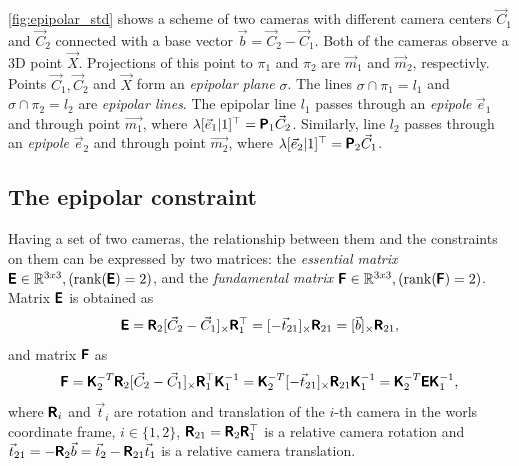 \autoref{fig:epipolar_std} shows a scheme of two cameras with different camera centers $\vec{C}_1$ and $\vec{C}_2$ connected with a base vector $\vec{b} = \vec{C}_2 - \vec{C}_1$. 
Both of the cameras observe a 3D point $\vec{X}$. 
Projections of this point to $\pi_1$ and $\pi_2$ are $\vec{m}_1$ and $\vec{m}_2$, respectivly. 
Points $\vec{C}_1, \vec{C}_2$ and $\vec{X}$ form an \textit{epipolar plane} $\sigma$.
The lines $\sigma \cap \pi_1 = l_1$ and $\sigma \cap \pi_2 = l_2$ are \textit{epipolar lines}. 
The epipolar line $l_1$ passes through an \textit{epipole} $\vec{e}_1$ and through point $\vec{m_1}$, where $\lambda [\vec{e}_1 | 1]^\top = \pmb{\mathsf{P}}_1 \vec{C}_2$.
Similarly, line $l_2$ passes through an \textit{epipole} $\vec{e}_2$ and through point $\vec{m_2}$, where $\lambda [\vec{e}_2 | 1]^\top = \pmb{\mathsf{P}}_2 \vec{C}_1$.

\subsection{The epipolar constraint}
Having a set of two cameras, the relationship between them and the constraints on them can be expressed by two matrices: the \textit{essential matrix} $\pmb{\mathsf{E}} \in \mathbb{R}^{3x3},(\operatorname{rank}(\pmb{\mathsf{E}}) = 2)$, and the \textit{fundamental matrix} $\pmb{\mathsf{F}} \in \mathbb{R}^{3x3}, (\operatorname{rank}(\pmb{\mathsf{F}}) = 2)$. Matrix $\pmb{\mathsf{E}}$ is obtained as
\begin{equation}
    \label{eq:E}
    \pmb{\mathsf{E}} = \pmb{\mathsf{R}}_2 [\vec{C}_2 - \vec{C}_1]_{\times} \pmb{\mathsf{R}}_1^\top = [-\vec{t}_{21}]_{\times} \pmb{\mathsf{R}}_{21} = [\vec{b}]_{\times} \pmb{\mathsf{R}}_{21},
\end{equation}
and matrix $\pmb{\mathsf{F}}$ as
\begin{equation}
    \label{eq:F}
    \pmb{\mathsf{F}} = \pmb{\mathsf{K}}_2^{-T} \pmb{\mathsf{R}}_2 [\vec{C}_2 - \vec{C}_1]_{\times} \pmb{\mathsf{R}}_1^\top \pmb{\mathsf{K}}_1^{-1} = 
    \pmb{\mathsf{K}}_2^{-T} [-\vec{t}_{21}]_{\times} \pmb{\mathsf{R}}_{21} \pmb{\mathsf{K}}_1^{-1} = 
    \pmb{\mathsf{K}}_2^{-T} \pmb{\mathsf{E}} \pmb{\mathsf{K}}_1^{-1},
\end{equation}
where 
$\pmb{\mathsf{R}}_i$ and $\vec{t}_i$ are rotation and translation of the $i$-th camera in the worls coordinate frame, $i \in \{1, 2\}$,
$\pmb{\mathsf{R}}_{21} = \pmb{\mathsf{R}}_2 \pmb{\mathsf{R}}_1^\top$ is a relative camera rotation and 
$\vec{t}_{21} = -\pmb{\mathsf{R}}_2 \vec{b} = \vec{t}_2 - \pmb{\mathsf{R}}_{21}\vec{t}_1$ is a relative camera translation.

